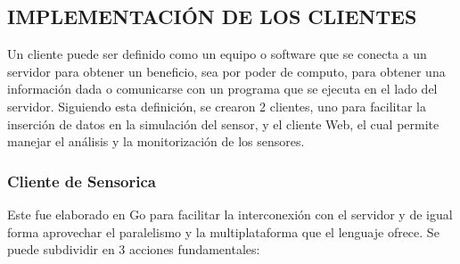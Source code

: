 
\subsection{IMPLEMENTACIÓN DE LOS CLIENTES}

Un cliente puede ser definido como un equipo o software que se conecta a un
servidor para obtener un beneficio, sea por poder de computo, para obtener
una información dada o comunicarse con un programa que se ejecuta en el lado
del servidor. Siguiendo esta definición, se crearon 2 clientes, uno para
facilitar la inserción de datos en la simulación del sensor, y el cliente Web,
el cual permite manejar el análisis y la monitorización de los sensores.

\subsubsection{Cliente de Sensorica}

Este fue elaborado en Go para facilitar la interconexión con el servidor y
de igual forma aprovechar el paralelismo y la multiplataforma que el
lenguaje ofrece. Se puede subdividir en 3 acciones fundamentales:

